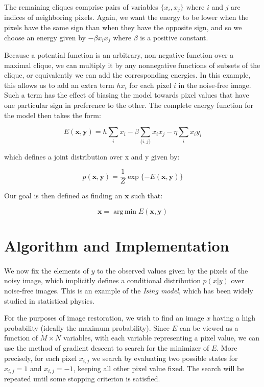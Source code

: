 \documentclass{article}
\begin{document}
The remaining cliques comprise pairs of variables $\{x_i, x_j\}$ where $i$ and $j$ are indices of neighboring pixels. Again, we want the energy to be lower when the pixels have the same sign than when they have the opposite sign, and so we choose an energy given by $-\beta x_i x_j$ where $\beta$ is a positive constant. 

Because a potential function is an arbitrary, non-negative function over a maximal clique, we can multiply it by any nonnegative functions of subsets of the clique, or equivalently we can add the corresponding energies. In this example, this allows us to add an extra term $hx_i$ for each pixel $i$ in the noise-free image. Such a term has the effect of biasing the model towards pixel values that have one particular sign in preference to the other. The complete energy function for the model then takes the form:

$$
E(\mathbf{x}, \mathbf{y}) = h \sum_{i}x_i - \beta\sum_{\{i, j\}}x_ix_j - \eta\sum_{i}x_iy_i
$$

which defines a joint distribution over x and y given by:

$$
p(\mathbf{x}, \mathbf{y}) = \frac{1}{Z}\exp\{-E(\mathbf{x}, \mathbf{y})\}
$$

Our goal is then defined as finding an $\mathbf{x}$ such that:

$$
\mathbf{x} = {\operatorname{arg\,min}} E(\mathbf{x}, \mathbf{y})
$$

\section{Algorithm and Implementation}

\paragraph{}
We now fix the elements of $y$ to the observed values given by the pixels of the noisy image, which implicitly defines a conditional distribution $p(x|y)$ over noise-free images. This is an example of the \textit{Ising model}, which has been widely studied in statistical physics. 

For the purposes of image restoration, we wish to find an image $x$ having a high probability (ideally the maximum probability). Since $E$ can be viewed as a function of $M \times N$ variables, with each variable representing a pixel value, we can use the method of gradient descent to search for the minimizer of $E$. More precisely, for each pixel $x_{i,j}$ we search by evaluating two possible states for $x_{i,j} = 1$ and $x_{i,j} = −1$, keeping all other pixel value fixed. The search will be repeated until some stopping criterion is satisfied.
\end{document}

